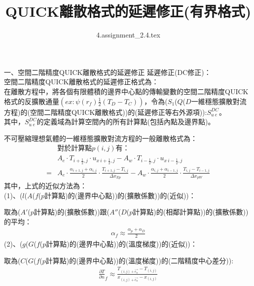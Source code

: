 \documentclass[12pt]{article}
\title{QUICK離散格式的延遲修正(有界格式)}
\author{4.assignment\_2.4.tex}
\begin{document}
 
\maketitle 
一、空間二階精度QUICK離散格式的延遲修正
\noindent   延遲修正(DC修正)：\\

\noindent 空間二階精度QUICK離散格式的延遲修正格式為：\\

{
    \centering
    在離散方程中，將各個有限體積的邊界中心點的傳輸變數的空間二階精度QUICK格式的反擴散通量$(ex : \psi(r_{f})\frac{1}{2}(T_{D} - T_{C}))$，令為($S_{1}$($Q$($D$一維穩態擴散對流方程)的(空間二階精度QUICK離散格式))的(延遲修正等右外源項)):$S_{u\ e}^{DC}$。\\
    其中，$S_{u\ e}^{DC}$的定義域為計算空間內的所有計算點(包括內點及邊界點)。
}

\vspace{0.7em}
\noindent 不可壓縮理想氣體的一維穩態擴散對流方程的一般離散格式為：
\begin{equation}
    \begin{split}
        &\mbox{對於計算點}p(i,j)\mbox{有：}\\
        &A_{e}\cdot T_{i+\frac{1}{2},j}\cdot u_{x\ i+\frac{1}{2},j}  -A_{w}\cdot T_{i-\frac{1}{2},j}\cdot u_{x\ i-\frac{1}{2},j} \\
        =&A_{e}\cdot \frac{\alpha_{i+1,j}+\alpha_{i,j}}{2}\cdot \frac{T_{i+1,j} - T_{i,j}}{\Delta x_{Ep}} - A_{w}\cdot \frac{\alpha_{i,j}+\alpha_{i-1,j}}{2}\cdot \frac{T_{i,j} - T_{i-1,j}}{\Delta x_{pW}}
    \end{split}
\end{equation}
\noindent 其中，上式的近似方法為：\\
\noindent (1)、($l$($A$($f$($p$計算點)的(邊界中心點))的(擴散係數))的(近似))：

取為($A'$($p$計算點)的(擴散係數))跟($A''$($D$($p$計算點)的(相鄰計算點))的(擴散係數))的平均：\\
\begin{equation}
    \begin{split}
        \alpha_{f} \approx \frac{\alpha_{p} + \alpha_{D}}{2}
    \end{split}
\end{equation}
\noindent (2)、($g$($G$($f$($p$計算點)的(邊界中心點))的(溫度梯度))的(近似))：

取為($C$($G$($f$($p$計算點)的(邊界中心點))的(溫度梯度))的(二階精度中心差分)):\\
\begin{equation}
\begin{split}
    \frac{\partial T}{\partial n}_{f} \approx \frac{T_{(i,j) + \vec{e_{n}}} - T_{(i,j)}}{x_{(i,j) + \vec{e_{n}}} - x_{(i,j)}}
\end{split}
\end{equation}
\end{document}
